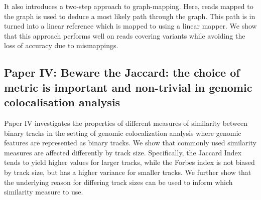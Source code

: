 It also introduces a two-step approach to graph-mapping.
Here, reads mapped to the graph is used to deduce a most likely path through the graph.
This path is in turned into a linear reference which is mapped to using a linear mapper.
We show that this approach performs well on reads covering variants while avoiding the loss of accuracy due to mismappings.

\subsection*{Paper IV: Beware the Jaccard: the choice of metric is important and non-trivial in genomic colocalisation analysis}
Paper IV investigates the properties of different measures of similarity between binary tracks in the setting of genomic colocalization analysis where genomic features are represented as binary tracks.
We show that commonly used similarity measures are affected differently by track size.
Specifically, the Jaccard Index tends to yield higher values for larger tracks, while the Forbes index is not biased by track size, but has a higher variance for smaller tracks. We further show that the underlying reason for differing track sizes can be used to inform which similarity measure to use.

